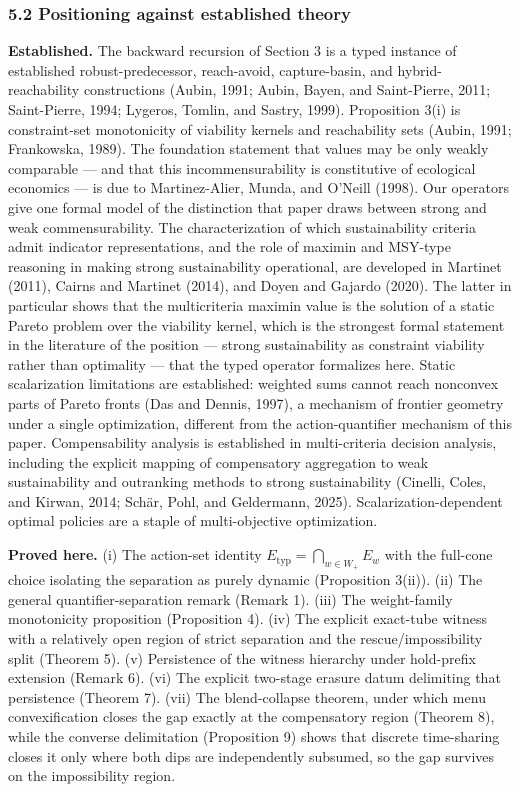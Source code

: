 \documentclass[11pt]{article}
\begin{document}
\subsubsection{5.2 Positioning against established
theory}\label{positioning-against-established-theory}

\textbf{Established.} The backward recursion of Section 3 is
a typed instance of established robust-predecessor, reach-avoid,
capture-basin, and hybrid-reachability constructions (Aubin, 1991;
Aubin, Bayen, and Saint-Pierre, 2011; Saint-Pierre, 1994; Lygeros,
Tomlin, and Sastry, 1999). Proposition 3(i) is constraint-set
monotonicity of viability kernels and reachability sets (Aubin, 1991;
Frankowska, 1989). The foundation statement that values may be only
weakly comparable --- and that this incommensurability is constitutive
of ecological economics --- is due to Martinez-Alier, Munda, and O'Neill
(1998). Our operators give one formal model of the distinction that
paper draws between strong and weak commensurability. The
characterization of which sustainability criteria admit indicator
representations, and the role of maximin and MSY-type reasoning in
making strong sustainability operational, are developed in Martinet
(2011), Cairns and Martinet (2014), and Doyen and Gajardo (2020). The
latter in particular shows that the multicriteria maximin value is the
solution of a static Pareto problem over the viability kernel, which is
the strongest formal statement in the literature of the position ---
strong sustainability as constraint viability rather than optimality ---
that the typed operator formalizes here. Static scalarization
limitations are established: weighted sums cannot reach nonconvex parts
of Pareto fronts (Das and Dennis, 1997), a mechanism of frontier
geometry under a single optimization, different from the
action-quantifier mechanism of this paper. Compensability analysis is
established in multi-criteria decision analysis, including the explicit
mapping of compensatory aggregation to weak sustainability and
outranking methods to strong sustainability (Cinelli, Coles, and Kirwan,
2014; Sch\"ar, Pohl, and Geldermann, 2025). Scalarization-dependent
optimal policies are a staple of multi-objective optimization.

\textbf{Proved here.} (i) The action-set identity \(E_{\mathrm{typ}} = \bigcap_{w \in W_+} E_w\) with the full-cone choice
isolating the separation as purely dynamic (Proposition 3(ii)). (ii) The
general quantifier-separation remark (Remark 1). (iii) The weight-family
monotonicity proposition (Proposition 4). (iv) The explicit exact-tube
witness with a relatively open region of strict separation and the
rescue/impossibility split (Theorem 5). (v) Persistence of the witness
hierarchy under hold-prefix extension (Remark 6). (vi) The explicit
two-stage erasure datum delimiting that persistence (Theorem 7). (vii)
The blend-collapse theorem, under which menu convexification closes the gap exactly at the compensatory region (Theorem
8), while the converse delimitation (Proposition 9) shows that discrete
time-sharing closes it only where both dips are independently subsumed,
so the gap survives on the impossibility region.
\end{document}
